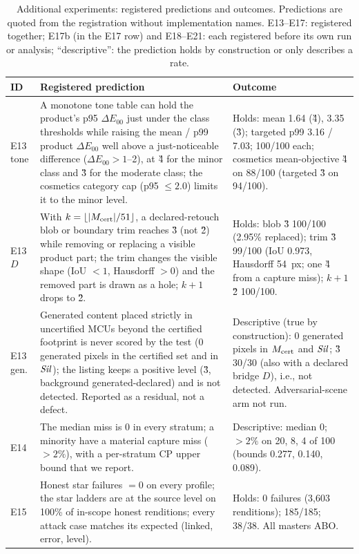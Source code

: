 \documentclass[10pt]{article}
\begin{document}
\begin{table}[!t]
\centering\fontsize{7}{8.1}\selectfont
\caption{Additional experiments: registered predictions and outcomes. Predictions are quoted from the registration
without implementation names. E13--E17: registered together; E17b (in the E17 row) and E18--E21: each registered
before its own run or analysis; ``descriptive'': the prediction holds by construction or only describes a rate.}
\label{tab:xpred}
\renewcommand{\arraystretch}{1.0}\setlength{\tabcolsep}{4pt}
\begin{tabularx}{\textwidth}{@{}L{1.25cm}YL{6.5cm}@{}}
\toprule
ID & Registered prediction & Outcome \\
\midrule
E13 tone & A monotone tone table can hold the product's p95 $\Delta E_{00}$ just under the class thresholds while raising the mean / p99 product $\Delta E_{00}$ well above a just-noticeable difference ($\Delta E_{00}>1$--2), at \G{4} for the minor class and \G{3} for the moderate class; the cosmetics category cap (p95 $\le2.0$) limits it to the minor level. & Holds: mean 1.64 (\G{4}), 3.35 (\G{3}); targeted p99 3.16 / 7.03; 100/100 each; cosmetics mean-objective \G{4} on 88/100 (targeted \G{3} on 94/100). \\
E13 $D$ & With $k=\lfloor|M_{\mathrm{cert}}|/51\rfloor$, a declared-retouch blob or boundary trim reaches \G{3} (not \G{2}) while removing or replacing a visible product part; the trim changes the visible shape (IoU $<1$, Hausdorff $>0$) and the removed part is drawn as a hole; $k+1$ drops to \G{2}. & Holds: blob \G{3} 100/100 (2.95\% replaced); trim \G{3} 99/100 (IoU 0.973, Hausdorff 54~px; one \G{4} from a capture miss); $k+1$ \G{2} 100/100. \\
E13 gen. & Generated content placed strictly in uncertified MCUs beyond the certified footprint is never scored by the \tierXa{} test (0 generated pixels in the certified set and in $\mathit{Sil}$); the listing keeps a positive level (\G{3}, background generated-declared) and is not detected. Reported as a residual, not a defect. & Descriptive (true by construction): 0 generated pixels in $M_{\mathrm{cert}}$ and $\mathit{Sil}$; \G{3} 30/30 (also with a declared bridge $D$), i.e., not detected. Adversarial-scene arm not run. \\
E14 & The median miss is 0 in every stratum; a minority have a material capture miss ($>2\%$), with a per-stratum CP upper bound that we report. & Descriptive: median 0; $>2\%$ on 20, 8, 4 of 100 (bounds 0.277, 0.140, 0.089). \\
E15 & Honest star failures $=0$ on every profile; the  star ladders are at the source level on 100\% of in-scope honest renditions; every attack case matches its expected (linked, error, level). & Holds: 0 failures (3,603 renditions); 185/185; 38/38. All masters ABO. \\

\end{tabularx}
\end{table}
\end{document}
